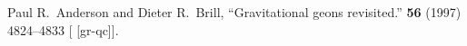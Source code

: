 \begin{thebibliography}{99}
Paul R.~Anderson and Dieter R.~Brill,
``Gravitational geons revisited.''
 \textbf{56} (1997) 4824--4833
{\tt{}}
[ [gr-qc]].
\end{thebibliography}
